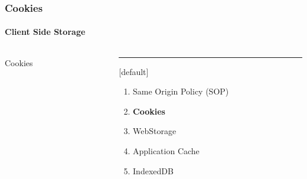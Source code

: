 \begin{frame}
\frametitle{Cookies}
\framesubtitle{Client Side Storage}
\begin{columns}[T] %
\begin{column}{.48\textwidth}

\begin{center}
{\Huge Cookies}
\end{center}

\end{column}%
\hfill%
\begin{column}{.48\textwidth}
\color{blue}\rule{\linewidth}{4pt}

	[default]
	\begin{enumerate}
		\item Same Origin Policy (SOP)
		\item \textbf{Cookies}
		\item WebStorage
		\item Application Cache
		\item IndexedDB
	\end{enumerate}
\end{column}%
\end{columns}
\end{frame}
